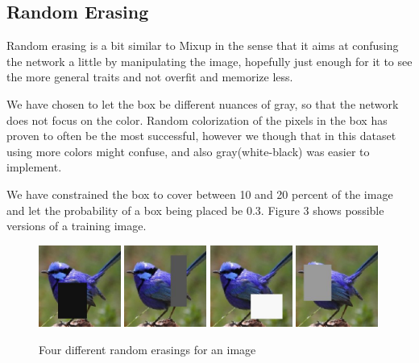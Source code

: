 \documentclass{article}
\begin{document}
\subsection{Random Erasing}

Random erasing is a bit similar to Mixup in the sense that it aims at confusing the network a little by manipulating the image, hopefully just enough for it to see the more general traits and not overfit and memorize less.

We have chosen to let the box be different nuances of gray, so that the network does not focus on the color. Random colorization of the pixels in the box has proven to often be the most successful, however we though that in this dataset using more colors might confuse, and also gray(white-black) was easier to implement.

We have constrained the box to cover between 10 and 20 percent of the image and let the probability of a box being placed be 0.3. Figure 3 shows possible versions of a training image.

\begin{figure}[h]
	\includegraphics[width=0.24\textwidth]{re1.jpeg}
	\includegraphics[width=0.24\textwidth]{re2.jpeg}
	\includegraphics[width=0.24\textwidth]{re3.jpeg}
	\includegraphics[width=0.24\textwidth]{re4.jpeg}
	\caption{Four different random erasings for an image}
\end{figure}
\end{document}
